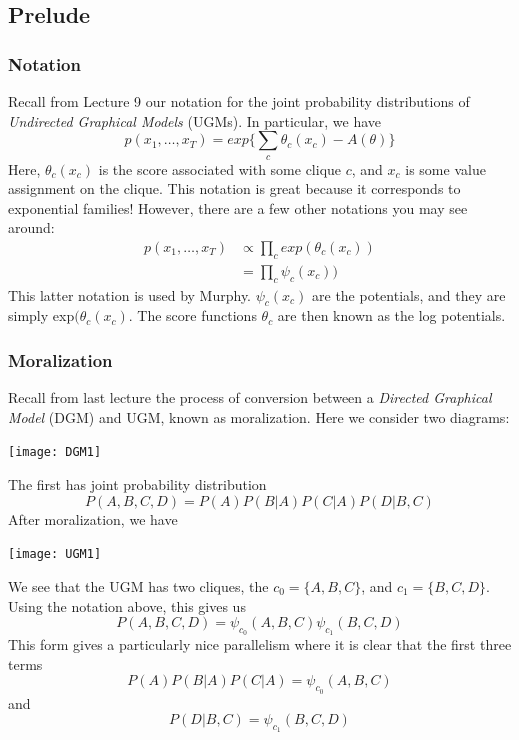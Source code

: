 \documentclass{article}
\begin{document}

\subsection{Prelude}
\subsubsection{Notation}
\label{sec:l10notation}
Recall from Lecture 9 our notation for the joint probability distributions of \textit{Undirected Graphical Models} (UGMs). In particular, we have
\[
p(x_1,\ldots,x_T)=exp\{\sum\limits_c \theta_c(x_c) - A(\theta)\}
\]
Here, $\theta_c(x_c)$ is the score associated with some clique $c$, and $x_c$ is some value assignment on the clique. This notation is great because it corresponds to exponential families! However, there are a few other notations you may see around:
\begin{align*}
p(x_1,\ldots,x_T) &\propto \prod\limits_c exp(\theta_c(x_c))\\
&= \prod\limits_c \psi_c(x_c))
\end{align*}
This latter notation is used by Murphy. $\psi_c(x_c)$ are the potentials, and they are simply exp$(\theta_c(x_c)$. The score functions $\theta_c$ are then known as the log potentials.
\subsubsection{Moralization}
Recall from last lecture the process of conversion between a \textit{Directed Graphical Model} (DGM) and UGM, known as moralization. Here we consider two diagrams:
\begin{center}
\texttt{[image: DGM1]}
\end{center}
The first has joint probability distribution
\[
P(A,B,C,D)=P(A)P(B|A)P(C|A)P(D|B,C)
\]
After moralization, we have
\begin{center}
\texttt{[image: UGM1]}
\end{center}
We see that the UGM has two cliques, the $c_0=\{A,B,C\}$, and $c_1=\{B,C,D\}$.
Using the notation above, this gives us
\[
P(A,B,C,D) = \psi_{c_0}(A,B,C)\psi_{c_1}(B,C,D)
\]
This form gives a particularly nice parallelism where it is clear that the first three terms 
\[
P(A)P(B|A)P(C|A)=\psi_{c_0}(A,B,C)
\]
and
\[
P(D|B,C)=\psi_{c_1}(B,C,D)
\]
\end{document}

